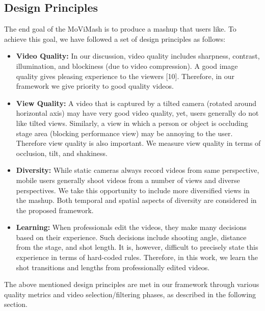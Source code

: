 \documentclass{sig-alternate-05-2015}
\begin{document}
\subsection{Design Principles}
The end goal of the MoViMash is to produce a mashup that users
like. To achieve this goal, we have followed a set of design principles as follows:
 \begin{itemize} 
    \item \textbf{Video Quality:} In our discussion, video quality includes
sharpness, contrast, illumination, and blockiness (due to video
compression). A good image quality gives pleasing experience to the viewers [10]. Therefore, in our framework we
give priority to good quality videos.
 \end{itemize} 
 \begin{itemize} 
    \item \textbf{View Quality:} A video that is captured by a tilted camera
(rotated around horizontal axis) may have very good video
quality, yet, users generally do not like tilted views. Similarly, a view in which a person or object is occluding stage
area (blocking performance view) may be annoying to the user. Therefore view quality is also important. We measure
view quality in terms of occlusion, tilt, and shakiness.
 \end{itemize} 
 \begin{itemize} 
    \item \textbf{Diversity:} While static cameras always record videos from
same perspective, mobile users generally shoot videos from
a number of views and diverse perspectives. We take this
opportunity to include more diversified views in the mashup.
Both temporal and spatial aspects of diversity are considered
in the proposed framework.
 \end{itemize} 
 \begin{itemize} 
    \item \textbf{Learning:} When professionals edit the videos, they make
many decisions based on their experience. Such decisions
include shooting angle, distance from the stage, and shot
length. It is, however, difficult to precisely state this experience in terms of hard-coded rules. Therefore, in this work,
we learn the shot transitions and lengths from professionally
edited videos.
 \end{itemize} \par
The above mentioned design principles are met in our framework
through various quality metrics and video selection/filtering phases,
as described in the following section.
\end{document}
